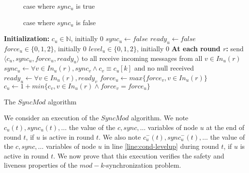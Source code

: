 \documentclass[11pt,letterpaper]{article}
\begin{document}
\begin{figure}[h]
    \centering
    \def\svgwidth{0.8\columnwidth}
	
	\caption{case where $sync_u$ is true}
	\label{fig:fig1}
\end{figure}

\begin{figure}[h]
    \centering
    \def\svgwidth{0.8\columnwidth}
	
	\caption{case where $sync_u$ is false}
	\label{fig:fig2}
\end{figure}


\begin{algorithm}[htb]
	\DontPrintSemicolon
	\textbf{Initialization:} \;
	\Indp
		$c_u \in \mathds{N}$, initially 0 \;
		$sync_u \leftarrow false$ \;
		$ready_u \leftarrow false$ \;
		$force_u \in \{0, 1, 2\}$, initially 0 \;
		$level_u \in \{0, 1, 2\}$, initially 0 \;
	\BlankLine
	\Indm
	\textbf{At each round $r$:} \;
	\Indp
		send $\langle c_u, sync_u, force_u, ready_u \rangle$ to all  \;
		receive incoming messages from all $v \in In_u(r)$ \;
		$sync_u \leftarrow \forall v \in In_u(r), sync_v \wedge c_v \equiv c_u [k]$ and no null received \; \label{line:conc-gossip}
		$ready_u \leftarrow \forall v \in In_u(r), ready_v$ \; \label{line:ready-gossip} 
		$force_u \leftarrow max \{force_v, v \in In_u(r) \}$ \;\label{line:force}
		$c_u \leftarrow 1+ min \{c_v, v \in In_u(r) \wedge force_v = force_u\}$ \;\label{line:min-z-end} 
	\Indm
\caption{The $SyncMod$ algorithm} 
\end{algorithm}

We consider an execution of the $SyncMod$ algorithm.
We note $c_u(t), sync_u(t), \dots$ the value of the $c, sync, \dots$ variables of node $u$ at the end of round $t$, if $u$ is active in round $t$.
We also note $c^-_u(t), sync^-_u(t), \dots$ the value of the $c, sync, \dots$ variables
of node $u$ in line \ref{line:cond-levelup} during round $t$, if $u$ is active in round $t$.
We now prove that this execution verifies the safety and liveness properties of the $mod-k$-synchronization problem.
\end{document}
